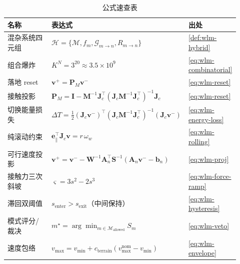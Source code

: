 \begin{table}[H]\centering\small
\caption{公式速查表}
\label{tab:wlm-cheatsheet}
\begin{tabular}{p{0.30\linewidth}p{0.40\linewidth}p{0.22\linewidth}}
\toprule
名称 & 表达式 & 出处 \\
\midrule
混杂系统四元组 & $\mathcal H=\{\mathcal M,f_m,\mathcal G_{m\to n},R_{m\to n}\}$ & \cref{def:wlm-hybrid} \\
组合爆炸 & $K^N=3^{20}\approx3.5\times10^9$ & \cref{eq:wlm-combinatorial} \\
落地 reset & $\mathbf v^+=\mathbf P_M\mathbf v^-$ & \cref{eq:wlm-reset} \\
接触投影 & $\mathbf P_M=\mathbf I-\mathbf M^{-1}\mathbf J_c^\top(\mathbf J_c\mathbf M^{-1}\mathbf J_c^\top)^{-1}\mathbf J_c$ & \cref{eq:wlm-reset} \\
切换能量损失 & $\Delta T=\tfrac12(\mathbf J_c\mathbf v^-)^\top(\mathbf J_c\mathbf M^{-1}\mathbf J_c^\top)^{-1}(\mathbf J_c\mathbf v^-)$ & \cref{eq:wlm-energy-loss} \\
纯滚动约束 & $\mathbf e_\parallel^\top\mathbf J_c\mathbf v=r\,\omega_w$ & \cref{eq:wlm-rolling} \\
可行速度投影 & $\mathbf v^+=\mathbf v^--\mathbf W^{-1}\mathbf A_n^\top\mathbf S^{-1}(\mathbf A_n\mathbf v^--\mathbf b_n)$ & \cref{eq:wlm-proj} \\
接触力三次斜坡 & $\varsigma=3s^2-2s^3$ & \cref{eq:wlm-force-ramp} \\
滞回双阈值 & $s_{\mathrm{enter}}>s_{\mathrm{exit}}$（中间保持） & \cref{eq:wlm-hysteresis} \\
模式评分/裁决 & $m^\star=\arg\min_{m\in\mathcal M_{\mathrm{allowed}}}S_m$ & \cref{eq:wlm-veto} \\
速度包络 & $v_{\max}=v_{\min}+c_{\mathrm{terrain}}(v_{\max}^{\mathrm{nom}}-v_{\min})$ & \cref{eq:wlm-envelope} \\
\bottomrule
\end{tabular}
\end{table}

